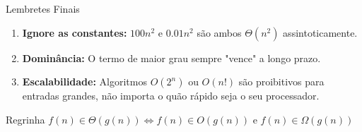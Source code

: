 \documentclass[aspectratio=169]{beamer}
\begin{document}
\begin{frame}{Lembretes Finais}
    \begin{enumerate}
        \item \textbf{Ignore as constantes:} $100n^2$ e $0.01n^2$ são ambos $\Theta(n^2)$ assintoticamente.
        \item \textbf{Dominância:} O termo de maior grau sempre "vence" a longo prazo.
        \item \textbf{Escalabilidade:} Algoritmos $O(2^n)$ ou $O(n!)$ são proibitivos para entradas grandes, não importa o quão rápido seja o seu processador.
    \end{enumerate}

    \begin{center}
        \begin{minipage}{0.8\textwidth}
            \begin{block}{Regrinha}
                $f(n) \in \Theta(g(n)) \iff f(n) \in O(g(n)) \text{ e } f(n) \in \Omega(g(n))$
            \end{block}
        \end{minipage}
    \end{center}
\end{frame}
\end{document}
